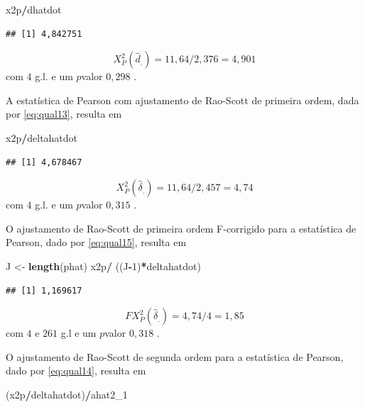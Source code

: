 \documentclass[]{book}
\newenvironment{Shaded}{\begin{snugshade}}{\end{snugshade}}
\newcommand{\KeywordTok}[1]{\textcolor[rgb]{0.13,0.29,0.53}{\textbf{#1}}}
\newcommand{\DecValTok}[1]{\textcolor[rgb]{0.00,0.00,0.81}{#1}}
\newcommand{\StringTok}[1]{\textcolor[rgb]{0.31,0.60,0.02}{#1}}
\newcommand{\OperatorTok}[1]{\textcolor[rgb]{0.81,0.36,0.00}{\textbf{#1}}}
\newcommand{\NormalTok}[1]{#1}
\theoremstyle{definition}
\theoremstyle{definition}
\theoremstyle{definition}
\theoremstyle{remark}
\begin{document}
\begin{Shaded}
\begin{Highlighting}[]
\NormalTok{x2p}\OperatorTok{/}\NormalTok{dhatdot}
\end{Highlighting}
\end{Shaded}

\begin{verbatim}
## [1] 4,842751
\end{verbatim}

\[
X_{P}^{2}\left( \hat{d}_{.}\right) =11,64/2,376=4,901 
\] com \(4\) g.l. e um \(p\)valor \(0,298\) .

A estatística de Pearson com ajustamento de Rao-Scott de primeira ordem,
dada por \eqref{eq:qual13}, resulta em

\begin{Shaded}
\begin{Highlighting}[]
\NormalTok{x2p}\OperatorTok{/}\NormalTok{deltahatdot }
\end{Highlighting}
\end{Shaded}

\begin{verbatim}
## [1] 4,678467
\end{verbatim}

\[
X_{P}^{2}\left( \hat{\delta}_{.}\right) =11,64/2,457=4,74 
\] com \(4\) g.l. e um \(p\)valor \(0,315\) .

O ajustamento de Rao-Scott de primeira ordem F-corrigido para a
estatística de Pearson, dado por \eqref{eq:qual15}, resulta em

\begin{Shaded}
\begin{Highlighting}[]
\NormalTok{J <-}\StringTok{ }\KeywordTok{length}\NormalTok{(phat)}
\NormalTok{x2p}\OperatorTok{/}\StringTok{ }\NormalTok{((J}\OperatorTok{-}\DecValTok{1}\NormalTok{)}\OperatorTok{*}\NormalTok{deltahatdot)}
\end{Highlighting}
\end{Shaded}

\begin{verbatim}
## [1] 1,169617
\end{verbatim}

\[
FX_{P}^{2}\left( \hat{\delta}_{.}\right) =4,74/4=1,85
\] com \(4\) e \(261\) g.l e um \(p\)valor \(0,318\) .

O ajustamento de Rao-Scott de segunda ordem para a estatística de
Pearson, dado por \eqref{eq:qual14}, resulta em

\begin{Shaded}
\begin{Highlighting}[]
\NormalTok{(x2p}\OperatorTok{/}\NormalTok{deltahatdot)}\OperatorTok{/}\NormalTok{ahat2_}\DecValTok{1}
\end{Highlighting}
\end{Shaded}
\end{document}
